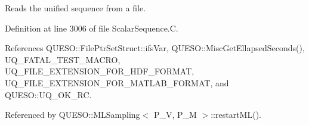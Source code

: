 Reads the unified sequence from a file. 



Definition at line 3006 of file Scalar\-Sequence.\-C.



References Q\-U\-E\-S\-O\-::\-File\-Ptr\-Set\-Struct\-::ifs\-Var, Q\-U\-E\-S\-O\-::\-Misc\-Get\-Ellapsed\-Seconds(), U\-Q\-\_\-\-F\-A\-T\-A\-L\-\_\-\-T\-E\-S\-T\-\_\-\-M\-A\-C\-R\-O, U\-Q\-\_\-\-F\-I\-L\-E\-\_\-\-E\-X\-T\-E\-N\-S\-I\-O\-N\-\_\-\-F\-O\-R\-\_\-\-H\-D\-F\-\_\-\-F\-O\-R\-M\-A\-T, U\-Q\-\_\-\-F\-I\-L\-E\-\_\-\-E\-X\-T\-E\-N\-S\-I\-O\-N\-\_\-\-F\-O\-R\-\_\-\-M\-A\-T\-L\-A\-B\-\_\-\-F\-O\-R\-M\-A\-T, and Q\-U\-E\-S\-O\-::\-U\-Q\-\_\-\-O\-K\-\_\-\-R\-C.



Referenced by Q\-U\-E\-S\-O\-::\-M\-L\-Sampling$<$ P\-\_\-\-V, P\-\_\-\-M $>$\-::restart\-M\-L().


